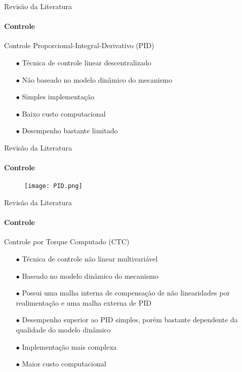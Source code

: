 \documentclass[25pt,landscape]{beamer}
\begin{document}
\begin{frame}{Revisão da Literatura}
    \framesubtitle{Controle}
    \begin{block}{Controle Proporcional-Integral-Derivativo (PID)}
        \begin{itemize}
            \item[$\bullet$] Técnica de controle linear descentralizado \\[8pt]
            \item[$\bullet$] Não baseado no modelo dinâmico do mecanismo \\[8pt]
            \item[$\bullet$] Simples implementação \\[8pt]
            \item[$\bullet$] Baixo custo computacional \\[8pt]
            \item[$\bullet$] Desempenho bastante limitado \\[8pt]
        \end{itemize}
    \end{block}
\end{frame}

\begin{frame}{Revisão da Literatura}
    \framesubtitle{Controle}
    \begin{figure}[!h]
        \centering
        \texttt{[image: PID.png]}
    \end{figure}  
\end{frame}

\begin{frame}{Revisão da Literatura}
    \framesubtitle{Controle}
    \begin{block}{Controle por Torque Computado (CTC)}
        \begin{itemize}
            \item[$\bullet$] Técnica de controle não linear multivariável \\[8pt]
            \item[$\bullet$] Baseado no modelo dinâmico do mecanismo \\[8pt]
            \item[$\bullet$] Possui uma malha interna de compensação de não linearidades por realimentação e uma malha externa de PID \\[8pt]
            \item[$\bullet$] Desempenho superior ao PID simples, porém bastante dependente da qualidade do modelo dinâmico \\[8pt]
            \item[$\bullet$] Implementação mais complexa \\[8pt]
            \item[$\bullet$] Maior custo computacional \\[8pt]
        \end{itemize}
    \end{block}
\end{frame}
\end{document}
